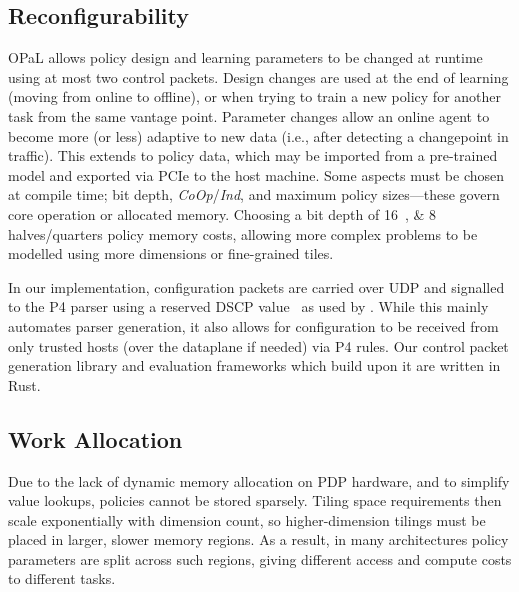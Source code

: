 \documentclass[
conference
,10pt
]{IEEEtran}
\newcommand{\approachshort}{OPaL}
\newcommand{\Coopfw}{\emph{CoOp}}
\newcommand{\Indfw}{\emph{Ind}}
\begin{document}
\subsection{Reconfigurability}
\approachshort{} allows policy design and learning parameters to be changed at runtime using at most two control packets.
Design changes are used at the end of learning (moving from online to offline), or when trying to train a new policy for another task from the same vantage point.
Parameter changes allow an online agent to become more (or less) adaptive to new data (i.e., after detecting a changepoint in traffic).
This extends to policy data, which may be imported from a pre-trained model and exported via PCIe to the host machine.
Some aspects must be chosen at compile time; bit depth, \Coopfw/\Indfw, and maximum policy sizes---these govern core operation or allocated memory.
Choosing a bit depth of \qtylist[list-pair-separator = { or }]{16;8}{\bit} halves/quarters policy memory costs, allowing more complex problems to be modelled using more dimensions or fine-grained tiles.

In our implementation, configuration packets are carried over UDP and signalled to the P4 parser using a reserved DSCP value~\parencite{rfc2474} as used by \textcite{DBLP:conf/isca/LiLYCSH19}.
While this mainly automates parser generation, it also allows for configuration to be received from only trusted hosts (over the dataplane if needed) via P4 rules.
Our control packet generation library and evaluation frameworks which build upon it are written in Rust.


\subsection{Work Allocation}\label{sec:work-allocation}
Due to the lack of dynamic memory allocation on PDP hardware, and to simplify value lookups, policies cannot be stored sparsely.
Tiling space requirements then scale exponentially with dimension count, so higher-dimension tilings must be placed in larger, slower memory regions.
As a result, in many architectures policy parameters are split across such regions, giving different access and compute costs to different tasks.
\end{document}
